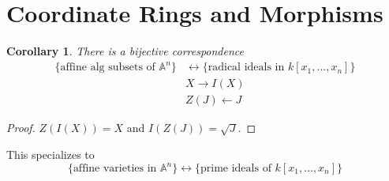 \documentclass{article}
\theoremstyle{definition}
\theoremstyle{remark}
\theoremstyle{plain}
\newtheorem{crly}[defn]{Corollary}
\newcommand{\bA}{\mathbb{A}}
\begin{document}
\section{Coordinate Rings and Morphisms}
\begin{crly}
    There is a bijective correspondence
    \begin{align*}\{\text{affine alg subsets of $\bA^n$}\}&\longleftrightarrow\{\text{radical ideals in }k[x_1,...,x_n]\}\\
    & X\rightarrow I(X)\\
    &Z(J)\leftarrow J
    \end{align*}
\end{crly}
\begin{proof}
    $Z(I(X))=X$ and $I(Z(J))=\sqrt J$.
\end{proof}
This specializes to 
\[\{\text{affine varieties in }\bA^n \}\leftrightarrow\{\text{prime ideals of }k[x_1,...,x_n]\}\]
\end{document}
